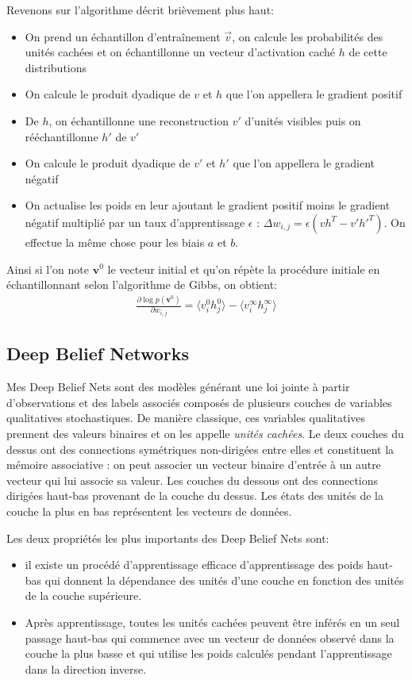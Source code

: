 \documentclass{article}
\theoremstyle{definition}
\begin{document}
\noindent Revenons sur l'algorithme décrit brièvement plus haut:
\begin{itemize}
\item On prend un échantillon d'entraînement $\vec{v}$, on calcule les probabilités des unités cachées et on échantillonne un vecteur d'activation caché $h$ de cette distributions
\item On calcule le produit dyadique de $v$ et $h$ que l'on appellera le gradient positif
\item De $h$, on échantillonne une reconstruction $v'$ d'unités visibles puis on rééchantillonne $h'$ de $v'$
\item On calcule le produit dyadique de $v'$ et $h'$ que l'on appellera le gradient négatif
\item On actualise les poids en leur ajoutant le gradient positif moins le gradient négatif multiplié par un taux d'apprentissage $\epsilon$ : $\Delta w_{i,j}=\epsilon (vh^T-v'h'^T)$. On effectue la même chose pour les biais $a$ et $b$.
\end{itemize}

\noindent Ainsi si l'on note $\textbf{v}^0$ le vecteur initial et qu'on répète la procédure initiale en échantillonnant selon l'algorithme de Gibbs, on obtient:
\begin{align*}
\frac{\partial \log p(\textbf{v}^0)}{\partial w_{i,j}}=\langle v_i^0 h_j^0\rangle-\langle v_i^{\infty} h_j^{\infty}\rangle
\end{align*}

\subsection{Deep Belief Networks}

\noindent Mes Deep Belief Nets sont des modèles générant une loi jointe à partir d'observations et des labels associés composés de plusieurs couches de variables qualitatives stochastiques. De manière classique, ces variables qualitatives prennent des valeurs binaires et on les appelle \textit{unités cachées}. Le deux couches du dessus ont des connections symétriques non-dirigées entre elles et constituent la mémoire associative : on peut associer un vecteur binaire d'entrée à un autre vecteur qui lui associe sa valeur. Les couches du dessous ont des connections dirigées haut-bas provenant de la couche du dessus. Les états des unités de la couche la plus en bas représentent les vecteurs de données.

\noindent Les deux propriétés les plus importants des Deep Belief Nets sont:
\begin{itemize}
\item il existe un procédé d'apprentissage efficace d'apprentissage des poids haut-bas qui donnent la dépendance des unités d'une couche en fonction des unités de la couche supérieure.
\item Après apprentissage, toutes les unités cachées peuvent être inférés en un seul passage haut-bas qui commence avec un vecteur de données observé dans la couche la plus basse et qui utilise les poids calculés pendant l'apprentissage dans la direction inverse.
\end{itemize}
\end{document}
